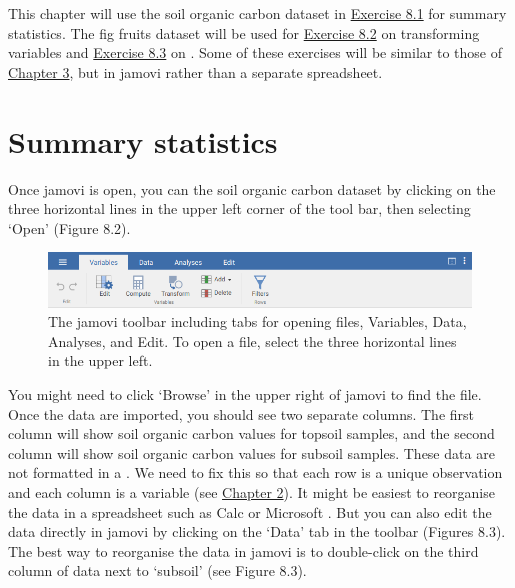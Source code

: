 \documentclass[
  openany]{krantz}
\begin{document}
This chapter will use the soil organic carbon dataset in \protect\hyperlink{02_summary_statistics}{Exercise 8.1} for summary statistics.
The fig fruits dataset will be used for \protect\hyperlink{02_transforming_variables}{Exercise 8.2} on transforming variables and \protect\hyperlink{02_computing_variables}{Exercise 8.3} on .
Some of these exercises will be similar to those of \protect\hyperlink{Chapter_3}{Chapter 3}, but in jamovi rather than a separate spreadsheet.

\hypertarget{summary_statistics_02}{%
\section{Summary statistics}\label{summary_statistics_02}}

Once jamovi is open, you can  the soil organic carbon dataset by clicking on the three horizontal lines in the upper left corner of the tool bar, then selecting `Open' (Figure 8.2).

\begin{figure}
\includegraphics[width=1\linewidth]{img/jamovi_toolbar} \caption{The jamovi toolbar including tabs for opening files, Variables, Data, Analyses, and Edit. To open a file, select the three horizontal lines in the upper left.}\label{fig:unnamed-chunk-26}
\end{figure}

You might need to click `Browse' in the upper right of jamovi to find the file.
Once the data are imported, you should see two separate columns.
The first column will show soil organic carbon values for topsoil samples, and the second column will show soil organic carbon values for subsoil samples.
These data are not formatted in a .
We need to fix this so that each row is a unique observation and each column is a variable (see \protect\hyperlink{Chapter_2}{Chapter 2}).
It might be easiest to reorganise the data in a spreadsheet such as  Calc or Microsoft .
But you can also edit the data directly in jamovi by clicking on the `Data' tab in the toolbar (Figures 8.3).
The best way to reorganise the data in jamovi is to double-click on the third column of data next to `subsoil' (see Figure 8.3).
\end{document}

